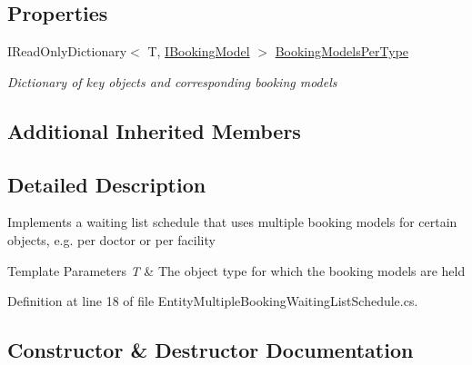 \subsection*{Properties}
\begin{DoxyCompactItemize}
\item 
I\+Read\+Only\+Dictionary$<$ T, \hyperlink{interface_general_health_care_elements_1_1_booking_models_1_1_i_booking_model}{I\+Booking\+Model} $>$ \hyperlink{class_general_health_care_elements_1_1_booking_models_1_1_entity_multiple_booking_waiting_list_schedule_a0e182854f565fe9e833710e445b2540a}{Booking\+Models\+Per\+Type}
\begin{DoxyCompactList}\small\item\em Dictionary of key objects and corresponding booking models \end{DoxyCompactList}\end{DoxyCompactItemize}
\subsection*{Additional Inherited Members}


\subsection{Detailed Description}
Implements a waiting list schedule that uses multiple booking models for certain objects, e.\+g. per doctor or per facility 


\begin{DoxyTemplParams}{Template Parameters}
{\em T} & The object type for which the booking models are held\\
\hline
\end{DoxyTemplParams}


Definition at line 18 of file Entity\+Multiple\+Booking\+Waiting\+List\+Schedule.\+cs.



\subsection{Constructor \& Destructor Documentation}
